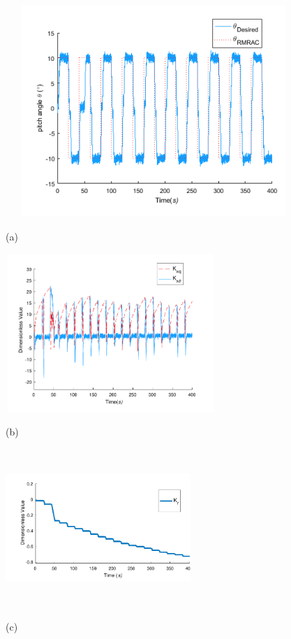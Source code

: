 \begin{figure}[htp]
\centering
\begin{minipage}{0.8\linewidth}
  \centerline{\includegraphics[width=13.0cm,height = 8cm]{figure/chap5/linear/RMRAC/RMRAC_x.pdf}}
  \centerline{(a) }
\end{minipage}
\vfill
\begin{minipage}{0.48\linewidth}
  \centerline{\includegraphics[width=8.0cm,height = 6cm]{figure/chap5/linear/RMRAC/K_x.pdf}}
  \centerline{(b) }
\end{minipage}
\hfill
\begin{minipage}{0.48\linewidth}
  \centerline{\includegraphics[width=7.0cm,height = 6cm]{figure/chap5/linear/RMRAC/K_r.pdf}}
  \centerline{(c) }
\end{minipage}
\label{fig:chap5:F2}
\end{figure}


